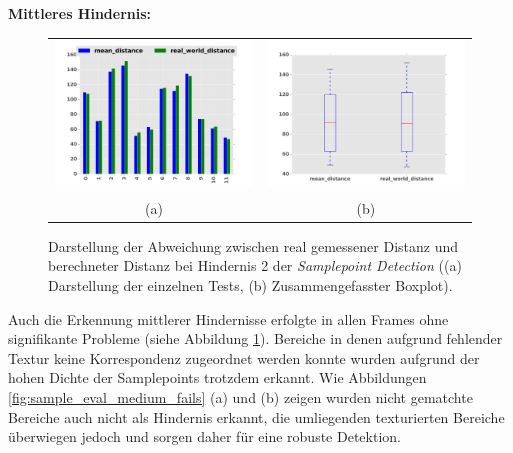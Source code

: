 \noindent
\textbf{Mittleres Hindernis:}\\

\begin{figure}[h]
	\centering
	\begin{tabular}{cc}
	\includegraphics[width=7cm]{img/evaluation/diagrams/sample_medium_bar}&
	\includegraphics[width=7cm]{img/evaluation/diagrams/sample_medium_box}\\
	 (a) & (b)
	\end{tabular}
	\caption{Darstellung der Abweichung zwischen real gemessener Distanz und berechneter Distanz bei Hindernis 2 der \emph{Samplepoint Detection} ((a) Darstellung der einzelnen Tests, (b) Zusammengefasster Boxplot).}
    \label{fig:sample_eval_medium}
\end{figure}

\noindent
Auch die Erkennung mittlerer Hindernisse erfolgte in allen Frames ohne signifikante Probleme (siehe Abbildung \ref{fig:sample_eval_medium}). Bereiche in denen aufgrund fehlender Textur keine Korrespondenz zugeordnet werden konnte wurden aufgrund der hohen Dichte der Samplepoints trotzdem erkannt. Wie Abbildungen \ref{fig:sample_eval_medium_fails} (a) und (b) zeigen wurden nicht gematchte Bereiche auch nicht als Hindernis erkannt, die umliegenden texturierten Bereiche überwiegen jedoch und sorgen daher für eine robuste Detektion.


